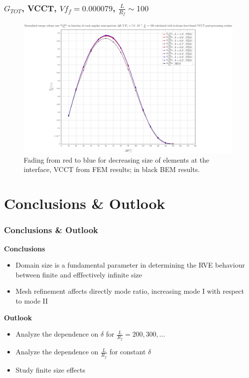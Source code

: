 \documentclass[first,firstsupp,lastsupp,last,hyperref,table]{ETHclass}
\begin{document}
\begin{frame}
\frametitle{\small $G_{TOT}$, VCCT, $Vf_{f}=0.000079$, $\frac{L}{R_{f}}\sim 100$}
\vspace{-0.5cm}
\centering
\captionsetup[figure]{font=scriptsize,labelfont=scriptsize}
\begin{figure}[!h]
\centering
\includegraphics[height=0.7\textheight]{2017-07-10_AbqRunSummary_SmallStrain_M-F-VCCT_GTOT.pdf}
  \caption{\scriptsize Fading from red to blue for decreasing size of elements at the interface, VCCT from FEM results; in black BEM results.}
  \label{fig:res1}
\end{figure}
\end{frame}

\section[Conclusions]{Conclusions \& Outlook}

\begin{frame}
\frametitle{\vspace*{0.5cm} Conclusions \& Outlook}
\vspace{-0.75cm}
\centering
\scriptsize
\begin{alertblock}{\footnotesize \bf{Conclusions}}
\begin{itemize}[label=]
  \item Domain size is a fundamental parameter in determining the RVE behaviour between finite and efffectively infinite size
	\item Mesh refinement affects directly mode ratio, increasing mode I with respect to mode II
\end{itemize}
\end{alertblock}
\begin{alertblock}{\footnotesize \bf{Outlook}}
\begin{itemize}[label=]
	\item Analyze the dependence on $\delta$ for $\frac{L}{R_{f}}=200,300,\dots$\\[9pt]
	\item Analyze the dependence on $\frac{L}{R_{f}}$ for constant $\delta$\\[9pt]
	\item Study finite size effects
\end{itemize}
\end{alertblock}
\end{frame}
\end{document}
